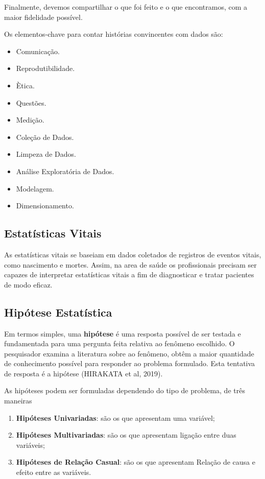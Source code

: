 Finalmente, devemos compartilhar o que foi feito e o que encontramos, com a maior fidelidade possível.\vskip0.3cm



\newpage

Os elementos-chave para contar histórias convincentes com dados são:

\begin{itemize}
\item Comunicação.
\item Reprodutibilidade.
\item Ètica.
\item Questões.
\item Medição.
\item Coleção de Dados.
\item Limpeza de Dados.
\item Análise Exploratória de Dados.
\item Modelagem.
\item Dimensionamento.
\end{itemize}




\subsection{Estatísticas Vitais}

As estatísticas vitais se baseiam em dados coletados de registros de eventos vitais, como nascimento e mortes. Assim, na area de saúde os profissionais precisam ser capazes de interpretar  estatísticas vitais a fim de diagnosticar e tratar pacientes de modo eficaz.



\subsection{Hipótese Estatística}

Em termos simples, uma \textbf{hipótese} é uma resposta possível de ser testada e fundamentada para uma pergunta feita relativa ao fenômeno escolhido. O pesquisador examina a literatura sobre ao fenômeno, obtêm a maior quantidade de conhecimento possível para responder ao problema formulado. Esta tentativa de resposta é a hipótese (HIRAKATA et al, 2019).\vskip0.3cm    

As hipóteses podem ser formuladas dependendo do tipo de problema, de três maneiras


\begin{enumerate}
\item \textbf{Hipóteses Univariadas}: são os que apresentam uma variável;  
\item \textbf{Hipóteses Multivariadas}: são os que apresentam ligação entre duas va\-ri\-á\-veis;
\item \textbf{Hipóteses de Relação Casual}: são os que apresentam Relação de causa e efeito entre as variáveis.
\end{enumerate}

